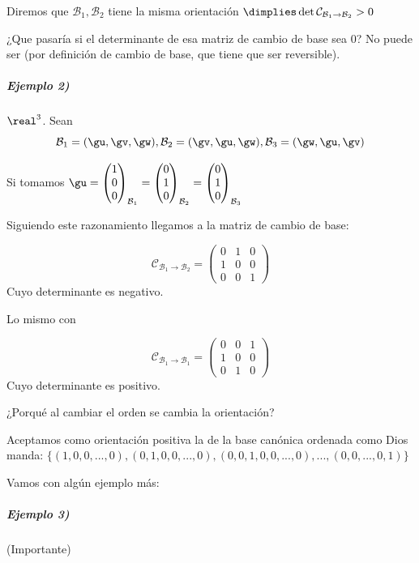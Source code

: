 \begin{defn}[Orientación]
Diremos que $\mathcal{B}_1,\mathcal{B}_2$ tiene la misma orientación $\dimplies \det \mathcal{C}_{\mathcal{B}_1\to\mathcal{B}_2} > 0$
\end{defn}

¿Que pasaría si el determinante de esa matriz de cambio de base sea 0? No puede ser (por definición de cambio de base, que tiene que ser reversible).

\subparagraph{Ejemplo 2)} $\real^3$.
Sean
\[\mathcal{B}_1 = (\gu,\gv,\gw),\mathcal{B}_2 = (\gv,\gu,\gw),\mathcal{B}_3 = (\gw,\gu,\gv)\]

Si tomamos $\gu = \begin{pmatrix} 1\\0\\0\end{pmatrix}_{\mathcal{B}_1} = \begin{pmatrix}0\\1\\0\end{pmatrix}_{\mathcal{B}_2} = \begin{pmatrix}0\\1\\0\end{pmatrix}_{\mathcal{B}_3} $

Siguiendo este razonamiento llegamos a la matriz de cambio de base:

\[\mathcal{C}_{\mathcal{B}_1\to\mathcal{B}_2} = \begin{pmatrix} 0 & 1 & 0 \\ 1 & 0 & 0 \\ 0 & 0 & 1 \end{pmatrix}\]
Cuyo determinante es negativo.

Lo mismo con 

\[\mathcal{C}_{\mathcal{B}_1\to\mathcal{B}_1} = \begin{pmatrix} 0 & 0 & 1 \\ 1 & 0 & 0 \\ 0 & 1 & 0 \end{pmatrix}\]
Cuyo determinante es positivo.

¿Porqué al cambiar el orden se cambia la orientación?

\obs Aceptamos como orientación positiva la de la base canónica ordenada como Dios manda: $\{(1,0,0,...,0), (0,1,0,0,...,0), (0,0,1,0,0,...,0),...,(0,0,...,0,1)\}$

Vamos con algún ejemplo más:

\subparagraph{Ejemplo 3)} (Importante)

